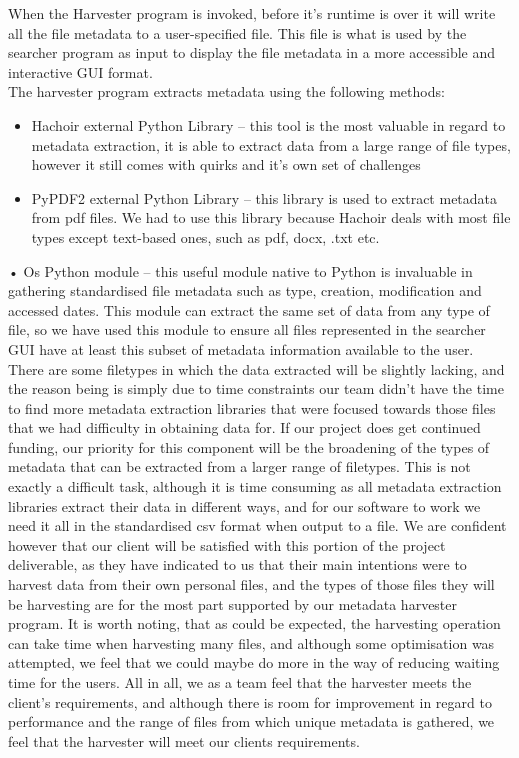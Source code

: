 \documentclass[11pt]{article}
\begin{document}
When the Harvester program is invoked, before it’s runtime is over it will write all the file metadata to a user-specified file. This file is what is used by the searcher program as input to display the file metadata in a more accessible and interactive GUI format. \\

The harvester program extracts metadata using the following methods:

\begin{itemize}
\item Hachoir external Python Library – this tool is the most valuable in regard to metadata extraction, it is able to extract data from a large range of file types, however it still comes with quirks and it’s own set of challenges
\item PyPDF2 external Python Library – this library is used to extract metadata from pdf files. We had to use this library because Hachoir deals with most file types except text-based ones, such as pdf, docx, .txt etc. 

\end{itemize}

•	Os Python module – this useful module native to Python is invaluable in gathering standardised file metadata such as type, creation, modification and accessed dates. This module can extract the same set of data from any type of file, so we have used this module to ensure all files represented in the searcher GUI have at least this subset of metadata information available to the user.
There are some filetypes in which the data extracted will be slightly lacking, and the reason being is simply due to time constraints our team didn’t have the time to find more metadata extraction libraries that were focused towards those files that we had difficulty in obtaining data for.
If our project does get continued funding, our priority for this component will be the broadening of the types of metadata that can be extracted from a larger range of filetypes. This is not exactly a difficult task, although it is time consuming as all metadata extraction libraries extract their data in different ways, and for our software to work we need it all in the standardised csv format when output to a file.
We are confident however that our client will be satisfied with this portion of the project deliverable, as they have indicated to us that their main intentions were to harvest data from their own personal files, and the types of those files they will be harvesting are for the most part supported by our metadata harvester program.
It is worth noting, that as could be expected, the harvesting operation can take time when harvesting many files, and although some optimisation was attempted, we feel that we could maybe do more in the way of reducing waiting time for the users.
All in all, we as a team feel that the harvester meets the client’s requirements, and although there is room for improvement in regard to performance and the range of files from which unique metadata is gathered, we feel that the harvester will meet our clients requirements.
\end{document}
